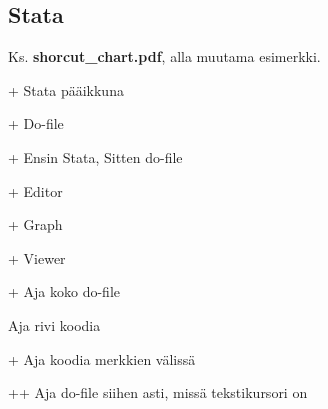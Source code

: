 \documentclass[a5paper,9pt]{scrartcl}
\begin{document}
    \subsection{Stata}
    
    Ks. \textbf{shorcut\_chart.pdf}, alla muutama esimerkki.
    
    \medskip
    
    + Stata pääikkuna
    
    +\keys{\shift} Do-file
    
    +\keys{\textgreater} Ensin Stata, Sitten do-file
    
    + Editor
    
    + Graph
    
    + Viewer
    
    \medskip
    
    \keys{\ctrl}+ Aja koko do-file
    
    \keys{\ctrl + \return} Aja rivi koodia
    
    +\keys{\return} Aja koodia merkkien \keys{\{} \keys{\}} välissä
    
    ++ Aja do-file siihen asti, missä tekstikursori on
    
    

    
\end{document}
